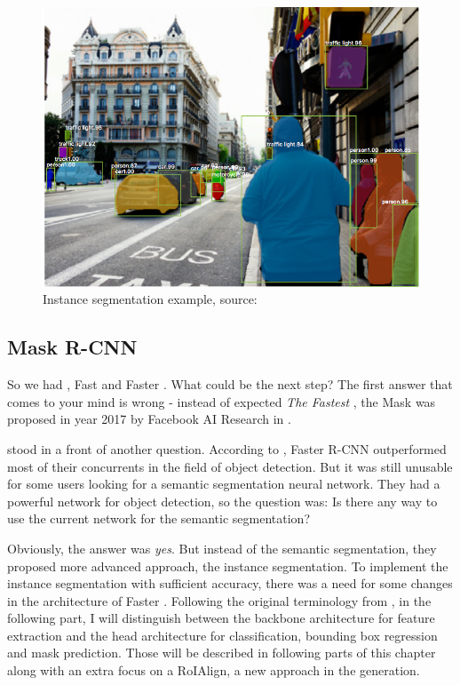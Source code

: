 \begin{figure}[H]
   \centering
	\includegraphics[width=0.8\linewidth]{./pictures/instance-segmentation.png}
	\caption[Instance segmentation example]{Instance segmentation example, source: \cite{mask-rcnn}}
      \label{fig:instance-segmentation}
\end{figure}

\subsection{Mask R-CNN}
\label{mask-rcnn}

So we had , Fast  and Faster . What could be the next step? The first answer that comes to your mind is wrong - instead of expected \textit{The Fastest }, the Mask  was proposed in year 2017 by Facebook AI Research  in \cite{mask-rcnn}.

 stood in a front of another question. According to \cite{faster-rcnn}, Faster R-CNN outperformed most of their concurrents in the field of object detection. But it was still unusable for some users looking for a semantic segmentation neural network. They had a powerful network for object detection, so the question was: Is there any way to use the current network for the semantic segmentation?

Obviously, the answer was \textit{yes}. But instead of the semantic segmentation, they proposed more advanced approach, the instance segmentation. To implement the instance segmentation with sufficient accuracy, there was a need for some changes in the architecture of Faster . Following the original terminology from \cite{mask-rcnn}, in the following part, I will distinguish between the backbone architecture for feature extraction and the head architecture for classification, bounding box regression and mask prediction. Those will be described in following parts of this chapter along with an extra focus on a RoIAlign, a new approach in the  generation.

